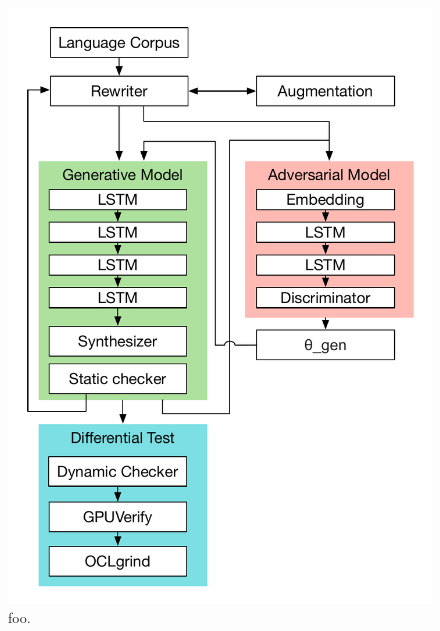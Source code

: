 \begin{figure}
        \centering
        \includegraphics[width=.95\columnwidth]{img/proc} %
        \caption{%
                foo.%
        }%
        \label{fig:deeptune}
\end{figure}










\printbibliography
        
